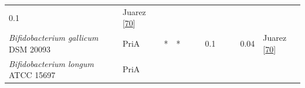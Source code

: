 \documentclass[12pt,twoside]{reedthesis}
\begin{document}
\begin{longtable}[]{@{}lllllllllll@{}}
\begin{minipage}[t]{0.03\columnwidth}
  0.1\strut
  \end{minipage} & \begin{minipage}[t]{0.11\columnwidth}\raggedright\strut
  Juarez
  {[}\protect\hyperlink{ref-juarez-vazquez_evolution_2017}{70}{]}\strut
  \end{minipage}\tabularnewline
  \begin{minipage}[t]{0.15\columnwidth}\raggedright\strut
  \emph{Bifidobacterium gallicum} DSM 20093\strut
  \end{minipage} & \begin{minipage}[t]{0.05\columnwidth}\raggedright\strut
  PriA\strut
  \end{minipage} & \begin{minipage}[t]{0.04\columnwidth}\raggedright\strut
  *\strut
  \end{minipage} & \begin{minipage}[t]{0.04\columnwidth}\raggedright\strut
  *\strut
  \end{minipage} & \begin{minipage}[t]{0.06\columnwidth}\raggedright\strut
  \strut
  \end{minipage} & \begin{minipage}[t]{0.06\columnwidth}\raggedright\strut
  \strut
  \end{minipage} & \begin{minipage}[t]{0.06\columnwidth}\raggedright\strut
  0.1\strut
  \end{minipage} & \begin{minipage}[t]{0.05\columnwidth}\raggedright\strut
  \strut
  \end{minipage} & \begin{minipage}[t]{0.05\columnwidth}\raggedright\strut
  \strut
  \end{minipage} & \begin{minipage}[t]{0.03\columnwidth}\raggedright\strut
  0.04\strut
  \end{minipage} & \begin{minipage}[t]{0.11\columnwidth}\raggedright\strut
  Juarez
  {[}\protect\hyperlink{ref-juarez-vazquez_evolution_2017}{70}{]}\strut
  \end{minipage}\tabularnewline
  \begin{minipage}[t]{0.15\columnwidth}\raggedright\strut
  \emph{Bifidobacterium longum} ATCC 15697\strut
  \end{minipage} & \begin{minipage}[t]{0.05\columnwidth}\raggedright\strut
  PriA\strut
  \end{minipage} & \begin{minipage}[t]{0.04\columnwidth}\raggedright\strut

\end{minipage}
\end{longtable}
\end{document}
